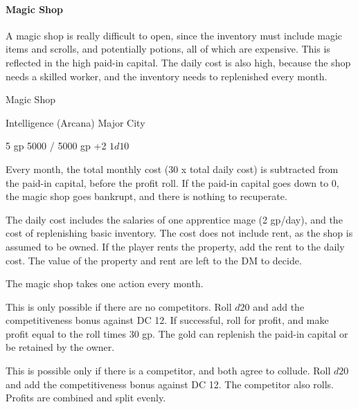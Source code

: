\documentclass[twocolumn]{dndbook}
\begin{document}
\paragraph{Magic Shop}

A magic shop is really difficult to open, since the inventory must include magic items and scrolls, and potentially potions, all of which are expensive.
This is reflected in the high paid-in capital.
The daily cost is also high, because the shop needs a skilled worker, and the inventory needs to replenished every month.

\begin{DndMonster}[width=.5\textwidth - 8pt]{Magic Shop}

	\hfill Intelligence (Arcana)
	\hfill Major City

	\hfill 5 gp
	\hfill 5000 / 5000 gp
	\hfill +2
	\hfill $1d10$

	Every month, the total monthly cost (30 x total daily cost) is subtracted
	from the paid-in capital, before the profit roll.
	If the paid-in capital goes down to 0, the magic shop goes bankrupt,
	and there is nothing to recuperate.\par

	The daily cost includes the salaries of one apprentice mage (2 gp/day),
	and the cost of replenishing basic inventory.
	The cost does not include rent, as the shop is assumed to be owned.
	If the player rents the property, add the rent to the daily cost.
	The value of the property and rent are left to the DM to decide.\par

	The magic shop takes one action every month.

	This is only possible if there are no competitors.
	Roll $d20$ and add the competitiveness bonus against DC 12.
	If successful, roll for profit, and make profit equal to the roll
	times 30 gp. The gold can replenish the paid-in capital or be retained by the owner.

	This is possible only if there is a competitor, and both agree to collude.
	Roll $d20$ and add the competitiveness bonus against DC 12.
	The competitor also rolls. Profits are combined and split evenly.


\end{DndMonster}
\end{document}
